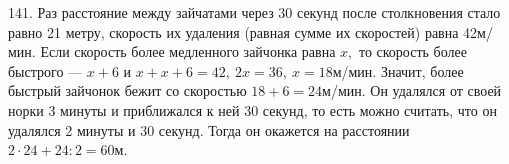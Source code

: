 141. Раз расстояние между зайчатами через 30 секунд после столкновения стало равно 21 метру, скорость их удаления (равная сумме их скоростей) равна 42м/мин. Если скорость более медленного зайчонка равна $x,$ то скорость более быстрого --- $x+6$ и $x+x+6=42,\ 2x=36,\ x=18$м/мин. Значит, более быстрый зайчонок бежит со скоростью $18+6=24$м/мин. Он удалялся от своей норки 3 минуты и приближался к ней 30 секунд, то есть можно считать, что он удалялся 2 минуты и 30 секунд. Тогда он окажется на расстоянии $2\cdot24+24:2=60$м.\\
